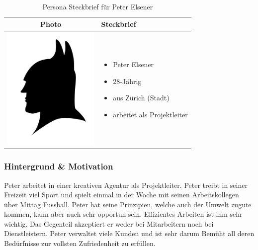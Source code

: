 \begin{table}[h!]
  \centering
  \begin{tabular}{ | c | m{5cm} | }
    \hline
    Photo & Steckbrief \\ \hline
    \begin{minipage}{.3\textwidth}
      \includegraphics[width=\linewidth, height=60mm]{images/batman.jpg}
    \end{minipage}
    &
      \begin{itemize}
        \item Peter Elsener
        \item 28-Jährig
        \item aus Zürich (Stadt)
        \item arbeitet als Projektleiter
      \end{itemize}
    \\ \hline
  \end{tabular}
  \caption{Persona Steckbrief für Peter Elsener}\label{tbl:steckbriefpeter}
\end{table}

\subsubsection{Hintergrund \& Motivation}
Peter arbeitet in einer kreativen Agentur als Projektleiter. Peter treibt in seiner Freizeit viel Sport und spielt einmal in der Woche mit seinen Arbeitskollegen über Mittag Fussball. Peter hat seine Prinzipien, welche auch der Umwelt zugute kommen, kann aber auch sehr opportun sein. Effizientes Arbeiten ist ihm sehr wichtig. Das Gegenteil akzeptiert er weder bei Mitarbeitern noch bei Dienstleistern. Peter verwaltet viele Kunden und ist sehr darum Bemüht all deren Bedürfnisse zur vollsten Zufriedenheit zu erfüllen.

